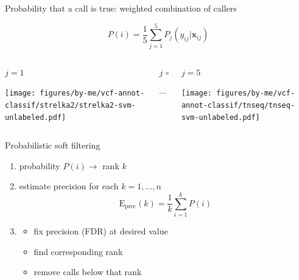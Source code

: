 \documentclass{beamer}
\begin{document}
\begin{frame}{Probability that a call is true: weighted combination of callers}
\begin{center}
\[
P(i) = \frac{1}{5} \sum_{j=1}^5 P_j(y_{ij} | \mathbf{x}_{ij})
\]
\end{center}
\begin{columns}[t]
\begin{column}{0.33\textwidth}
\begin{center}
\(j=1\)
\end{center}

\texttt{[image: figures/by-me/vcf-annot-classif/strelka2/strelka2-svm-unlabeled.pdf]}
\end{column}

\begin{column}{0.33\textwidth}
\begin{center}
\(j=...\)

\vspace{0.7in}
\large
\(\cdots\)
\normalsize
\end{center}
\end{column}

\begin{column}{0.33\textwidth}
\begin{center}
\(j=5\)
\end{center}

\texttt{[image: figures/by-me/vcf-annot-classif/tnseq/tnseq-svm-unlabeled.pdf]}
\end{column}
\end{columns}
\end{frame}

\begin{frame}{Probabilistic soft filtering}
\begin{enumerate}
\item probability \(P(i) \rightarrow \) rank \(k\)
\item estimate precision for each \(k=1,...,n\)
\[
\mathrm{E}_\mathrm{prec}(k) = \frac{1}{k} \sum_{i=1}^k P(i)
\] 
\item
\begin{itemize}
\item fix precision (FDR) at desired value
\item find corresponding rank
\item remove calls below that rank 
\end{itemize}
\end{enumerate}
\end{frame}
\end{document}
